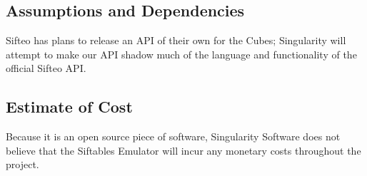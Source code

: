 \documentclass[12pt]{article}
\begin{document}
              \subsection{Assumptions and Dependencies}
              Sifteo has plans to release an API of their own for the Cubes; Singularity will attempt to make our API shadow much of the language and functionality of the official Sifteo API. 

              \subsection{Estimate of Cost}
			  Because it is an open source piece of software, Singularity Software does not believe that the Siftables Emulator will incur any monetary costs throughout the project.
\clearpage
\end{document}
